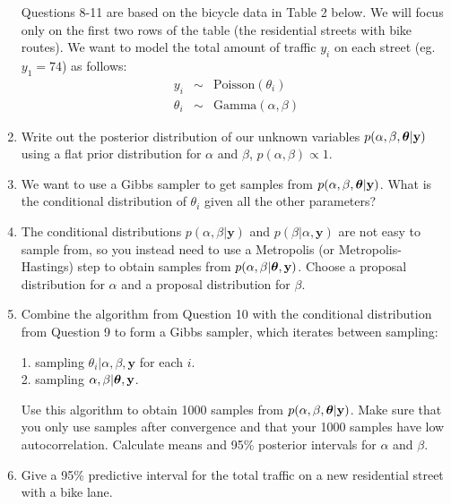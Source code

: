 \documentclass[12pt]{article}
\def\y{\mathbf{y}}
\newcommand{\bth}{\mbox{\boldmath $\theta$}}
\begin{document}
\begin{enumerate}{\leftmargin=1em}
\vspace{.05cm}
Questions 8-11 are based on the bicycle data in Table 2 below. We will focus only on the 
first two rows of the table (the residential streets with bike routes).  We want to model 
the total amount of traffic $y_i$ on each street (eg. $y_1=74$) as follows:
%
\begin{eqnarray*}
        y_i & \sim & \mbox{Poisson}(\theta_i)\\
   \theta_i & \sim & \mbox{Gamma}(\alpha,\beta)
\end{eqnarray*}

\item Write out the posterior distribution of our unknown variables $p(\alpha,\beta,\bth|\y)$ using a flat prior distribution for $\alpha$ and $\beta$, $p(\alpha,\beta) \propto 1$.

\item We want to use a Gibbs sampler to get samples from $p(\alpha,\beta,\bth|\y)$. What is the conditional distribution of $\theta_i$ given all the other parameters?

\item The conditional distributions $p(\alpha,\beta|\y)$ and $p(\beta|\alpha,\y)$ are not 
easy to sample from, so you instead need to use a Metropolis (or Metropolis-Hastings) step 
to obtain samples from $p(\alpha,\beta|\bth,\y)$. Choose a proposal distribution for 
$\alpha$ and a proposal distribution for $\beta$.

\item Combine the algorithm from Question 10 with the conditional distribution from 
Question 9 to form a Gibbs sampler, which iterates between sampling:

1. sampling $\theta_i | \alpha,\beta,\y$ for each $i$.\\
2. sampling $\alpha,\beta|\bth,\y$.

Use this algorithm to obtain 1000 samples from $p(\alpha,\beta,\bth|\y)$. Make sure that 
you only use samples after convergence and that your 1000 samples have low autocorrelation.
Calculate means and 95\% posterior intervals for $\alpha$ and $\beta$.

\item Give a 95\% predictive interval for the total traffic on a new residential street 
with a bike lane. 
\end{enumerate}
\newpage
\end{document}
